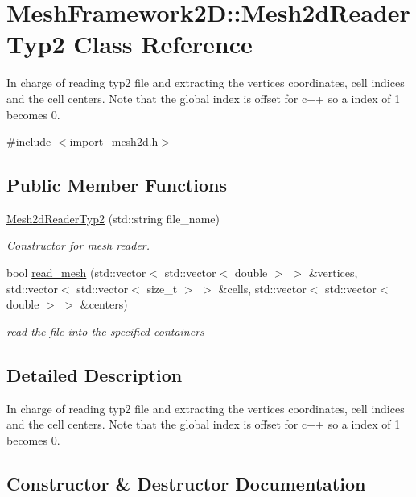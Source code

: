 \hypertarget{classMeshFramework2D_1_1Mesh2dReaderTyp2}{}\section{Mesh\+Framework2D\+:\+:Mesh2d\+Reader\+Typ2 Class Reference}
\label{classMeshFramework2D_1_1Mesh2dReaderTyp2}


In charge of reading typ2 file and extracting the vertices coordinates, cell indices and the cell centers. Note that the global index is offset for c++ so a index of 1 becomes 0.  




{\ttfamily \#include $<$import\+\_\+mesh2d.\+h$>$}

\subsection*{Public Member Functions}
\begin{DoxyCompactItemize}
\item 
\hyperlink{classMeshFramework2D_1_1Mesh2dReaderTyp2_a4894381f40e8b298838c01eee7ba1f73}{Mesh2d\+Reader\+Typ2} (std\+::string file\+\_\+name)
\begin{DoxyCompactList}\small\item\em Constructor for mesh reader. \end{DoxyCompactList}\item 
bool \hyperlink{classMeshFramework2D_1_1Mesh2dReaderTyp2_aabe68be0d5249d435f77aa14e65b0c40}{read\+\_\+mesh} (std\+::vector$<$ std\+::vector$<$ double $>$ $>$ \&vertices, std\+::vector$<$ std\+::vector$<$ size\+\_\+t $>$ $>$ \&cells, std\+::vector$<$ std\+::vector$<$ double $>$ $>$ \&centers)
\begin{DoxyCompactList}\small\item\em read the file into the specified containers \end{DoxyCompactList}\end{DoxyCompactItemize}


\subsection{Detailed Description}
In charge of reading typ2 file and extracting the vertices coordinates, cell indices and the cell centers. Note that the global index is offset for c++ so a index of 1 becomes 0. 

\subsection{Constructor \& Destructor Documentation}
\mbox{\label{classMeshFramework2D_1_1Mesh2dReaderTyp2_a4894381f40e8b298838c01eee7ba1f73}} 

